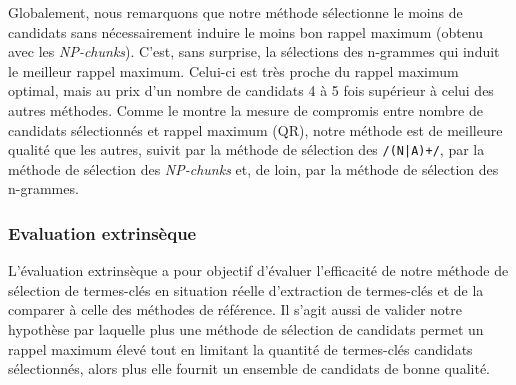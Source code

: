         Globalement, nous remarquons que notre méthode sélectionne le moins de
        candidats sans nécessairement induire le moins bon rappel maximum
        (obtenu avec les \textit{NP-chunks}).
        C'est, sans surprise, la sélections des n-grammes qui induit le meilleur
        rappel maximum. Celui-ci est très proche du rappel maximum optimal, mais
        au prix d'un nombre de candidats 4 à 5 fois supérieur à celui des autres
        méthodes. Comme le montre la mesure de compromis entre nombre de
        candidats sélectionnés et rappel maximum (QR), notre méthode
        est de meilleure qualité que les autres, suivit par la méthode de
        sélection des \texttt{/(N|A)+/}, par la méthode de sélection des
        \textit{NP-chunks} et, de loin, par la méthode de sélection des
        n-grammes.

      \subsubsection{Evaluation extrinsèque}
      \label{subsubsec:main-automatic_keyphrase_annotation-keyphrase_candidate_selection-evaluation-extrinsic_evaluation}
        L'évaluation extrinsèque a pour objectif d'évaluer l'efficacité de notre
        méthode de sélection de termes-clés en situation réelle d'extraction de
        termes-clés et de la comparer à celle des méthodes de référence.
        Il s'agit aussi de valider notre hypothèse par laquelle plus une méthode
        de sélection de candidats permet un rappel maximum élevé tout en
        limitant la quantité de termes-clés candidats sélectionnés, alors plus
        elle fournit un ensemble de candidats de bonne qualité.

